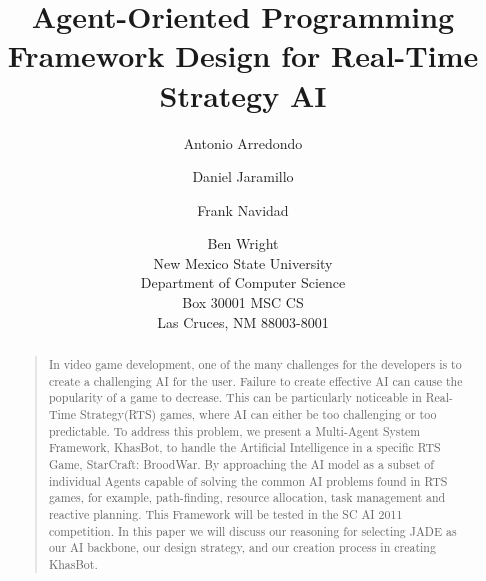 \documentclass[letterpaper]{article}
\begin{document}
%
\title{Agent-Oriented Programming Framework Design for Real-Time Strategy AI}

\author{Antonio Arredondo\and Daniel Jaramillo\and Frank Navidad\and Ben Wright\\
New Mexico State University \\ Department of Computer Science \\ Box 30001 MSC CS \\ Las Cruces, NM 88003-8001
}


\maketitle
\begin{abstract}
\begin{quote}
In video game development, one of the many challenges for the developers is to create a challenging AI for the user.  Failure to create effective AI can cause the popularity of a game to decrease.  This can be particularly noticeable in Real-Time Strategy(RTS) games, where AI can either be too challenging or too predictable.  To address this problem, we present a Multi-Agent System Framework, KhasBot, to handle the Artificial Intelligence in a specific RTS Game, StarCraft: BroodWar.  By approaching the AI model as a subset of individual Agents capable of solving the common AI problems found in RTS games, for example, path-finding, resource allocation, task management and reactive planning.  This Framework will be tested in the SC AI 2011 competition.  In this paper we will discuss our reasoning for selecting JADE as our AI backbone, our design strategy, and our creation process in creating KhasBot.
\end{quote}
\end{abstract}
\end{document}
